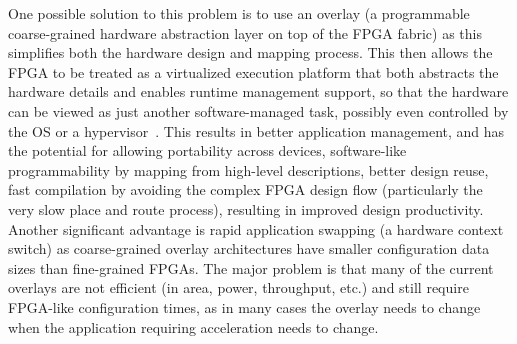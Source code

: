 One possible solution to this problem is to use an overlay (a programmable coarse-grained hardware abstraction layer on top of the FPGA fabric) as this simplifies both the hardware design and mapping process. This then allows the FPGA to be treated as a virtualized execution platform that both abstracts the hardware details and enables runtime management support, so that the hardware can be viewed as just another software-managed task, possibly even controlled by the OS or a hypervisor~\cite{jain2014virtualized}. This results in better application management, and has the potential for allowing portability across devices, software-like programmability by mapping from high-level descriptions, better design reuse, fast compilation by avoiding the complex FPGA design flow (particularly the very slow place and route process), resulting in improved design productivity. Another significant advantage is rapid application swapping (a hardware context switch) as coarse-grained overlay architectures have smaller configuration data sizes than fine-grained FPGAs.  The major problem is that many of the current overlays are not efficient (in area, power, throughput, etc.) and still require FPGA-like configuration times, as in many cases the overlay needs to change when the application requiring acceleration needs to change.
